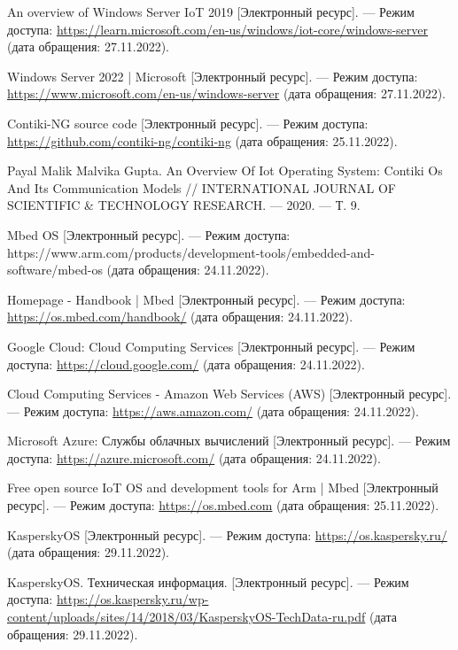 \begin{thebibliography}{}
	An overview of Windows Server IoT 2019 [Электронный ресурс]. — Режим доступа: \url{https://learn.microsoft.com/en-us/windows/iot-core/windows-server} (дата обращения: 27.11.2022).
	
	Windows Server 2022 | Microsoft [Электронный ресурс]. — Режим доступа: \url{https://www.microsoft.com/en-us/windows-server} (дата
	обращения: 27.11.2022).
	
	Contiki-NG source code [Электронный ресурс]. — Режим доступа: \url{https://github.com/contiki-ng/contiki-ng} (дата обращения:
	25.11.2022).
	
	Payal Malik Malvika Gupta. An Overview Of Iot
	Operating System: Contiki Os And Its Communication Models //
	INTERNATIONAL JOURNAL OF SCIENTIFIC \& TECHNOLOGY
	RESEARCH. — 2020. — Т. 9.
	
	Mbed OS [Электронный ресурс]. — Режим доступа:
	{https://www.arm.com/products/development-tools/embedded-and-software/mbed-os} (дата обращения: 24.11.2022).
	
	Homepage - Handbook | Mbed [Электронный ресурс]. — Режим доступа: \url{https://os.mbed.com/handbook/} (дата обращения:
	24.11.2022).
	
	Google Cloud: Cloud Computing Services [Электронный ресурс]. — Режим доступа: \url{https://cloud.google.com/} (дата обращения:
	24.11.2022).
	
	Cloud Computing Services - Amazon Web Services (AWS) [Электронный ресурс]. — Режим доступа: \url{https://aws.amazon.com/} (дата
	обращения: 24.11.2022).
	
	Microsoft Azure: Службы облачных вычислений [Электронный
	ресурс]. — Режим доступа: \url{https://azure.microsoft.com/} (дата обращения: 24.11.2022).
	
	Free open source IoT OS and development tools for Arm | Mbed
	[Электронный ресурс]. — Режим доступа: \url{https://os.mbed.com} (дата обращения: 25.11.2022).
	
	KasperskyOS [Электронный ресурс]. — Режим доступа: \url{https://os.kaspersky.ru/} (дата обращения: 29.11.2022).
	
	KasperskyOS. Техническая информация. [Электронный ресурс]. — Режим доступа: \url{https://os.kaspersky.ru/wp-content/uploads/sites/14/2018/03/KasperskyOS-TechData-ru.pdf} (дата обращения:
	29.11.2022).
	

\end{thebibliography}
